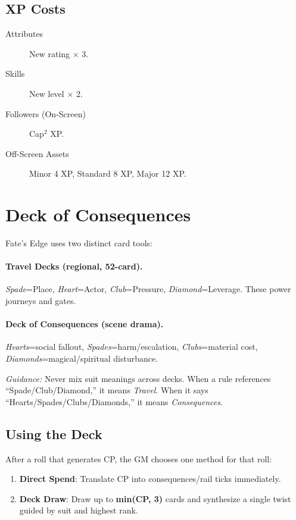 \subsection{XP Costs}

\begin{description}
\item[Attributes] New rating $\times$ 3.
\item[Skills] New level $\times$ 2.
\item[Followers (On-Screen)] Cap$^2$ XP.
\item[Off-Screen Assets] Minor 4 XP, Standard 8 XP, Major 12 XP.
\end{description}

\section{Deck of Consequences}

Fate's Edge uses two distinct card tools:

\paragraph{Travel Decks (regional, 52-card).}
\emph{Spade}=Place, \emph{Heart}=Actor, \emph{Club}=Pressure, \emph{Diamond}=Leverage. These power journeys and gates.

\paragraph{Deck of Consequences (scene drama).}
\emph{Hearts}=social fallout, \emph{Spades}=harm/escalation, \emph{Clubs}=material cost, \emph{Diamonds}=magical/spiritual disturbance.

\textit{Guidance:} Never mix suit meanings across decks. When a rule references ``Spade/Club/Diamond,'' it means \emph{Travel}. When it says ``Hearts/Spades/Clubs/Diamonds,'' it means \emph{Consequences}.

\subsection{Using the Deck}

After a roll that generates CP, the GM chooses one method for that roll:
\begin{enumerate}
  \item \textbf{Direct Spend}: Translate CP into consequences/rail ticks immediately.
  \item \textbf{Deck Draw}: Draw up to \textbf{min(CP, 3)} cards and synthesize a single twist guided by suit and highest rank.
\end{enumerate}

